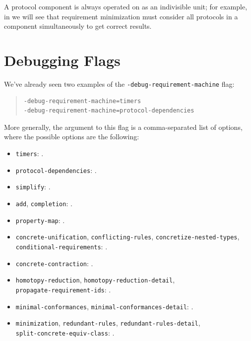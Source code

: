 \documentclass[../generics]{subfiles}
\begin{document}
A protocol component is always operated on as an indivisible unit; for example, in  we will see that requirement minimization must consider all protocols in a component simultaneously to get correct results.

\section{Debugging Flags}\label{rqm debugging flags}

We've already seen two examples of the \texttt{-debug-requirement-machine} flag:
\begin{quote}
\begin{verbatim}
-debug-requirement-machine=timers
-debug-requirement-machine=protocol-dependencies
\end{verbatim}
\end{quote}
More generally, the argument to this flag is a comma-separated list of options, where the possible options are the following:
\begin{itemize}
\item \texttt{timers}: .
\item \texttt{protocol-dependencies}: .
\item \texttt{simplify}: .
\item \texttt{add}, \texttt{completion}: .
\item \texttt{property-map}: .
\item \texttt{concrete-unification}, \texttt{conflicting-rules}, \texttt{concretize-nested-types},\\
\texttt{conditional-requirements}: .
\item \texttt{concrete-contraction}: .
\item \texttt{homotopy-reduction}, \texttt{homotopy-reduction-detail},\\
\texttt{propagate-requirement-ids}: .
\item \texttt{minimal-conformances}, \texttt{minimal-conformances-detail}: .
\item \texttt{minimization},  \texttt{redundant-rules}, \texttt{redundant-rules-detail},\\
\texttt{split-concrete-equiv-class}: .
\end{itemize}
\end{document}
